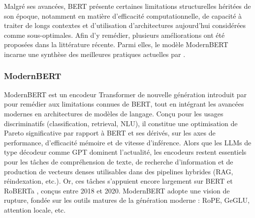 Malgré ses avancées, BERT présente certaines limitations structurelles héritées de son époque, notamment en matière d’efficacité computationnelle, de capacité à traiter de longs contextes et d’utilisation d’architectures aujourd’hui considérées comme sous-optimales. Afin d’y remédier, plusieurs améliorations ont été proposées dans la littérature récente. Parmi elles, le modèle ModernBERT incarne une synthèse des meilleures pratiques actuelles par \citep{warner2024modernbert}.

\subsubsection{ModernBERT}

ModernBERT est un encodeur Transformer de nouvelle génération introduit par \citep{warner2024modernbert} pour remédier aux limitations connues de BERT, tout en intégrant les avancées modernes en architectures de modèles de langage. Conçu pour les usages discriminatifs (classification, retrieval, NLU), il constitue une optimisation de Pareto significative par rapport à BERT et ses dérivés, sur les axes de performance, d'efficacité mémoire et de vitesse d'inférence. Alors que les LLMs de type décodeur comme GPT dominent l'actualité, les encodeurs restent essentiels pour les tâches de compréhension de texte, de recherche d'information et de production de vecteurs denses utilisables dans des pipelines hybrides (RAG, réindexation, etc.). Or, ces tâches s'appuient encore largement sur BERT et RoBERTa \citep{liu2019roberta}, conçus entre 2018 et 2020. ModernBERT adopte une vision de rupture, fondée sur les outils matures de la génération moderne : RoPE, GeGLU, attention locale, etc.\\

